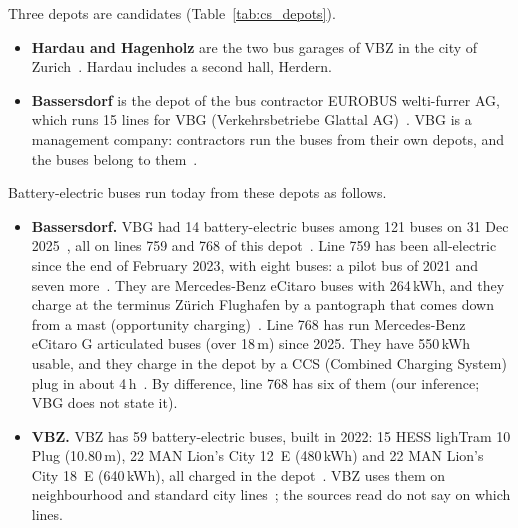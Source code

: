 \documentclass[11pt,a4paper]{article}
\theoremstyle{plain}
\theoremstyle{definition}
\theoremstyle{remark}
\begin{document}
Three depots are candidates (Table~\ref{tab:cs_depots}).
\begin{itemize}
  \item \textbf{Hardau and Hagenholz} are the two bus garages of VBZ in the city of Zurich~\cite{VBZ2026Depots}.
    Hardau includes a second hall, Herdern.
  \item \textbf{Bassersdorf} is the depot of the bus contractor EUROBUS welti-furrer AG, which runs 15 lines for VBG (Verkehrsbetriebe Glattal AG)~\cite{VBG2026Partner}.
    VBG is a management company: contractors run the buses from their own depots, and the buses belong to them~\cite[p.~25]{VBG2026Report}.
\end{itemize}
Battery-electric buses run today from these depots as follows.
\begin{itemize}
  \item \textbf{Bassersdorf.} VBG had 14 battery-electric buses among 121 buses on 31 Dec 2025~\cite[p.~4]{VBG2026Report}, all on lines 759 and 768 of this depot~\cite{VBG2026Fleet}.
    Line 759 has been all-electric since the end of February 2023, with eight buses: a pilot bus of 2021 and seven more~\cite{VBG2023Release759}.
    They are Mercedes-Benz eCitaro buses with 264\,kWh, and they charge at the terminus Z\"urich Flughafen by a pantograph that comes down from a mast (opportunity charging)~\cite{VBG2023Line759}.
    Line 768 has run Mercedes-Benz eCitaro G articulated buses (over 18\,m) since 2025.
    They have 550\,kWh usable, and they charge in the depot by a CCS (Combined Charging System) plug in about 4\,h~\cite{VBG2025Line768}.
    By difference, line 768 has six of them (our inference; VBG does not state it).
  \item \textbf{VBZ.} VBZ has 59 battery-electric buses, built in 2022: 15 HESS lighTram 10 Plug (10.80\,m), 22 MAN Lion's City 12~E (480\,kWh) and 22 MAN Lion's City 18~E (640\,kWh), all charged in the depot~\cite{VBZ2025Batteriebusse}.
    VBZ uses them on neighbourhood and standard city lines~\cite{VBZ2026Elektromobilitaet}; the sources read do not say on which lines.
\end{itemize}
\end{document}
